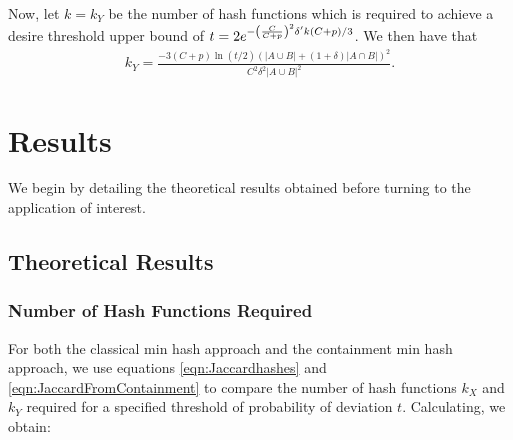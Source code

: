 \documentclass[11pt,reqno]{amsart}
\theoremstyle{remark}
\numberwithin{equation}{section}
\newcommand{\classicX}{X}
\newcommand{\containX}{Y}
\begin{document}
Now, let $k=k_\containX$ be the number of hash functions which is required to achieve a desire threshold upper bound of $t=2e^{-\left(\frac{C}{C+p}\right)^2\delta\rq{}k(C+p)/3}$. We then have that
 \begin{align}
 \label{eqn:JaccardFromContainment}
 k_\containX =\frac{-3(C+p)\ln(t/2)\left(|A\cup B|+(1+\delta)|A\cap B|\right)^2}{C^2\delta^2|A\cup B|^2 }.
 \end{align}

 

\section{Results}
We begin by detailing the theoretical results obtained before turning to the application of interest.

\subsection{Theoretical Results}
\subsubsection{Number of Hash Functions Required}
\label{section:NumberOfHashes}
For both the classical min hash approach and the containment min hash approach, we use equations \eqref{eqn:Jaccardhashes} and \eqref{eqn:JaccardFromContainment} to compare the number of hash functions $k_\classicX$ and $k_\containX$ required for a specified threshold of probability of deviation $t$. Calculating, we obtain: 
\end{document}
